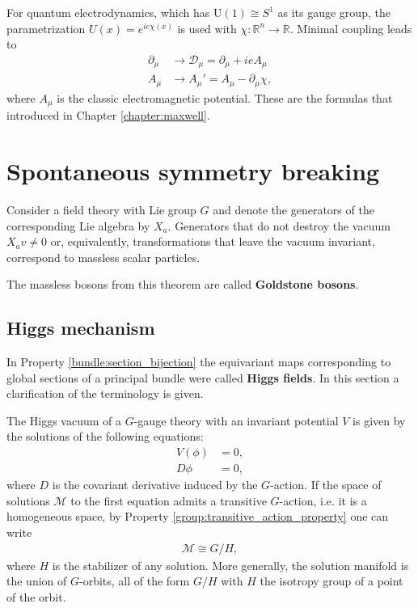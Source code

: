     \begin{example}[QED]
        For quantum electrodynamics, which has $\mathrm{U}(1)\cong S^1$ as its gauge group, the parametrization $U(x) = e^{ie\chi(x)}$ is used with $\chi:\mathbb{R}^n\rightarrow\mathbb{R}$. Minimal coupling leads to
        \begin{align}
            \partial_\mu &\longrightarrow\mathcal{D}_\mu = \partial_\mu + ieA_\mu\\
            A_\mu &\longrightarrow A_\mu' = A_\mu - \partial_\mu\chi,
        \end{align}
        where $A_\mu$ is the classic electromagnetic potential. These are the formulas that introduced in Chapter \ref{chapter:maxwell}.
    \end{example}

\section{Spontaneous symmetry breaking}

    \begin{theorem}[Goldstone]
        Consider a field theory with Lie group $G$ and denote the generators of the corresponding Lie algebra by $X_a$. Generators that do not destroy the vacuum $X_av\neq0$ or, equivalently, transformations that leave the vacuum invariant, correspond to massless scalar particles.
    \end{theorem}
    The massless bosons from this theorem are called \textbf{Goldstone bosons}.

\subsection{Higgs mechanism}

    In Property \ref{bundle:section_bijection} the equivariant maps corresponding to global sections of a principal bundle were called \textbf{Higgs fields}. In this section a clarification of the terminology is given.

    The Higgs vacuum of a $G$-gauge theory with an invariant potential $V$ is given by the solutions of the following equations:
    \begin{align}
        V(\phi) &= 0,\\
        D\phi &= 0,
    \end{align}
    where $D$ is the covariant derivative induced by the $G$-action. If the space of solutions $\mathcal{M}$ to the first equation admits a transitive $G$-action, i.e. it is a homogeneous space, by Property \ref{group:transitive_action_property} one can write
    \begin{gather}
        \mathcal{M}\cong G/H,
    \end{gather}
    where $H$ is the stabilizer of any solution. More generally, the solution manifold is the union of $G$-orbits, all of the form $G/H$ with $H$ the isotropy group of a point of the orbit.

